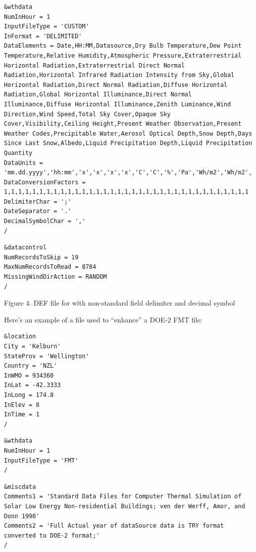 \begin{lstlisting}
&wthdata
NumInHour = 1
InputFileType = 'CUSTOM'
InFormat = 'DELIMITED'
DataElements = Date,HH:MM,Datasource,Dry Bulb Temperature,Dew Point Temperature,Relative Humidity,Atmospheric Pressure,Extraterrestrial Horizontal Radiation,Extraterrestrial Direct Normal Radiation,Horizontal Infrared Radiation Intensity from Sky,Global Horizontal Radiation,Direct Normal Radiation,Diffuse Horizontal Radiation,Global Horizontal Illuminance,Direct Normal Illuminance,Diffuse Horizontal Illuminance,Zenith Luminance,Wind Direction,Wind Speed,Total Sky Cover,Opaque Sky Cover,Visibility,Ceiling Height,Present Weather Observation,Present Weather Codes,Precipitable Water,Aerosol Optical Depth,Snow Depth,Days Since Last Snow,Albedo,Liquid Precipitation Depth,Liquid Precipitation Quantity
DataUnits = 'mm.dd.yyyy','hh:mm','x','x','x','x','C','C','%','Pa','Wh/m2','Wh/m2','Wh/m2','Wh/m2','Wh/m2','Wh/m2','lux','lux','lux','Cd/m2','deg','m/s','tenths','tenths','km','m','x','x','mm','{.001}','cm','x','{.01}','mm','hr'
DataConversionFactors = 1,1,1,1,1,1,1,1,1,1,1,1,1,1,1,1,1,1,1,1,1,1,1,1,1,1,1,1,1,1,1,1,1,1,1
DelimiterChar = ';'
DateSeparator = '.'
DecimalSymbolChar = ','
/
\end{lstlisting}

\begin{lstlisting}
&datacontrol
NumRecordsToSkip = 19
MaxNumRecordsToRead = 8784
MissingWindDirAction = RANDOM
/
\end{lstlisting}

Figure 4. DEF file for with non-standard field delimiter and decimal symbol

Here's an example of a file used to ``enhance'' a DOE-2 FMT file:

\begin{lstlisting}
&location
City = 'Kelburn'
StateProv = 'Wellington'
Country = 'NZL'
InWMO = 934360
InLat = -42.3333
InLong = 174.8
InElev = 8
InTime = 1
/
\end{lstlisting}

\begin{lstlisting}
&wthdata
NumInHour = 1
InputFileType = 'FMT'
/
\end{lstlisting}

\begin{lstlisting}
&miscdata
Comments1 = 'Standard Data Files for Computer Thermal Simulation of Solar Low Energy Non-residential Buildings; ven der Werff, Amor, and Donn 1990'
Comments2 = 'Full Actual year of dataSource data is TRY format converted to DOE-2 format;'
/
\end{lstlisting}

